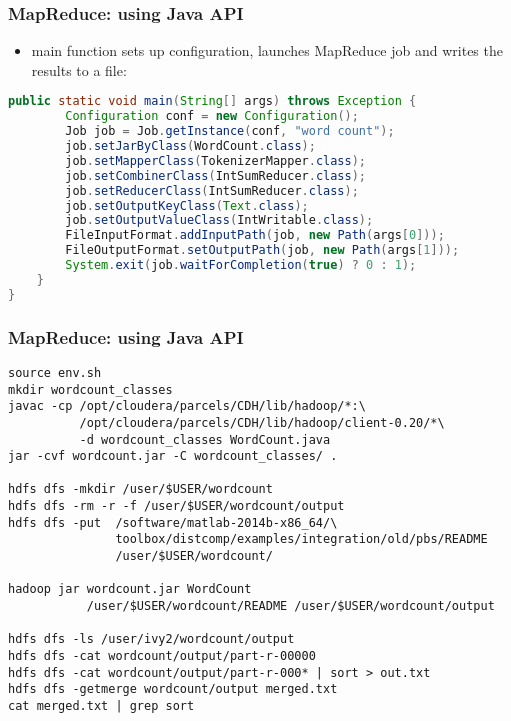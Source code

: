 \documentclass{beamer}
\begin{document}
\begin{frame}[fragile]
 \frametitle{MapReduce: using Java API}

\begin{itemize}
  \item {\color{blue}main} function sets up configuration, launches MapReduce job and writes the results to a file:
\end{itemize}
{\color{mycolorcode}
  \begin{lstlisting}[frame=single, basicstyle=\tiny,language=java]
    public static void main(String[] args) throws Exception {
        Configuration conf = new Configuration();
        Job job = Job.getInstance(conf, "word count");
        job.setJarByClass(WordCount.class);
        job.setMapperClass(TokenizerMapper.class);
        job.setCombinerClass(IntSumReducer.class);
        job.setReducerClass(IntSumReducer.class);
        job.setOutputKeyClass(Text.class);
        job.setOutputValueClass(IntWritable.class);
        FileInputFormat.addInputPath(job, new Path(args[0]));
        FileOutputFormat.setOutputPath(job, new Path(args[1]));
        System.exit(job.waitForCompletion(true) ? 0 : 1);
    }
}
  \end{lstlisting}
}
\end{frame}

\begin{frame}[fragile]
 \frametitle{MapReduce: using Java API}
{\color{mycolorcli}
  \begin{lstlisting}[frame=single, basicstyle=\tiny]
source env.sh
mkdir wordcount_classes
javac -cp /opt/cloudera/parcels/CDH/lib/hadoop/*:\
          /opt/cloudera/parcels/CDH/lib/hadoop/client-0.20/*\ 
          -d wordcount_classes WordCount.java
jar -cvf wordcount.jar -C wordcount_classes/ .

hdfs dfs -mkdir /user/$USER/wordcount
hdfs dfs -rm -r -f /user/$USER/wordcount/output
hdfs dfs -put  /software/matlab-2014b-x86_64/\
               toolbox/distcomp/examples/integration/old/pbs/README 
               /user/$USER/wordcount/

hadoop jar wordcount.jar WordCount 
           /user/$USER/wordcount/README /user/$USER/wordcount/output

hdfs dfs -ls /user/ivy2/wordcount/output
hdfs dfs -cat wordcount/output/part-r-00000
hdfs dfs -cat wordcount/output/part-r-000* | sort > out.txt
hdfs dfs -getmerge wordcount/output merged.txt
cat merged.txt | grep sort
\end{lstlisting}
}


\end{frame}
\end{document}
